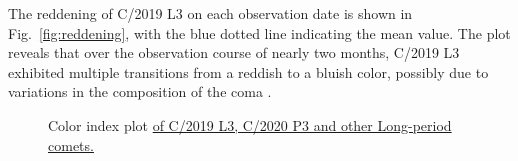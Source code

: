 The reddening of C/2019 L3 on each observation date is shown in Fig.~\ref{fig:reddening}, with the blue dotted line indicating the mean value. The plot reveals that over the observation course of nearly two months, C/2019 L3 exhibited multiple transitions from a reddish to a bluish color, possibly due to variations in the composition of the coma \citep{ivanova_colour_2017}.


\begin{figure}
    \centering
   
    \caption{Color index plot \ul{of C/2019 L3, C/2020 P3 and other Long-period comets.} }\label{fig:color_index}
\end{figure}


